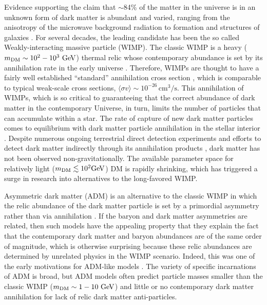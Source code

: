 \documentclass[useAMS,usenatbib]{mnras}
\begin{document}
  Evidence supporting the claim that $\sim$84\% of the matter in the universe is in 
  an unknown form of dark matter is abundant and varied, ranging from the 
  anisotropy of the microwave background radiation to formation and structures of galaxies 
  \citep[e.g.,][]{jungman_etal96,Bertone+05,PLanck18}. 
  For several decades, the leading candidate has been the so called 
  Weakly-interacting massive particle (WIMP). 
  The classic WIMP is a heavy ($m_{\mathrm{DM}} \sim 10^2-10^3 \ \mathrm{GeV}$) 
  thermal relic whose contemporary abundance is set 
  by its annihilation rate in the early universe 
  \cite[e.g.,][]{kolb_turner90}. 
  Therefore, WIMPs are thought to have a fairly well established ``standard'' annihilation 
  cross section \citep[e.g.,][]{steigman_etal12}, which is comparable to typical weak-scale 
  cross sections, $\langle \sigma v \rangle \sim 10^{-26} \, \mathrm{cm}^3/\mathrm{s}$. 
  This annihilation of WIMPs, which is so critical to guaranteeing that the 
  correct abundance of dark matter in the contemporary Universe, in turn, 
  limits the number of particles that can accumulate within a star. 
  The rate of capture of new dark matter particles 
  comes to equilibrium with dark matter particle annihilation in the 
  stellar interior \citep{krauss_etal85}. 
  Despite numerous ongoing terrestrial direct detection experiments 
  \citep[see][for a review]{Schumann19} 
  and efforts to detect dark matter indirectly through 
  its annihilation products \citep[reviewed in][]{Slatyer17}, 
  dark matter has not been observed non-gravitationally. The 
  available parameter space for relatively light ($m_{\mathrm{DM}} \lesssim 10^2 \mathrm{GeV}$) DM
  is rapidly shrinking, which has triggered a surge in research into 
  alternatives to the long-favored WIMP.


  Asymmetric dark matter (ADM) is an alternative to the classic WIMP in which 
  the relic abundance of the dark matter particle is set by a primordial asymmetry 
  rather than via annihilation \citep[for a review, see][and references therein]{adm_review}. 
  If the baryon and dark matter asymmetries are 
  related, then such models have the appealing property that they explain 
  the fact that the contemporary dark matter and baryon abundances are 
  of the same order of magnitude, which is otherwise surprising because 
  these relic abundances are determined by unrelated physics in the WIMP 
  scenario. Indeed, this was one of the early motivations for ADM-like 
  models \citep[e.g.,][]{Nussinov85,barr_etal90,chivukula_walker90,kaplan92}. 
  The variety of specific incarnations of ADM is broad, 
  but ADM models often predict particle masses smaller than 
  the classic WIMP ($m_{\mathrm{DM}} \sim 1-10 \ \mathrm{GeV}$) and little or no 
  contemporary dark matter annihilation for lack of relic 
  dark matter anti-particles. 
\end{document}
